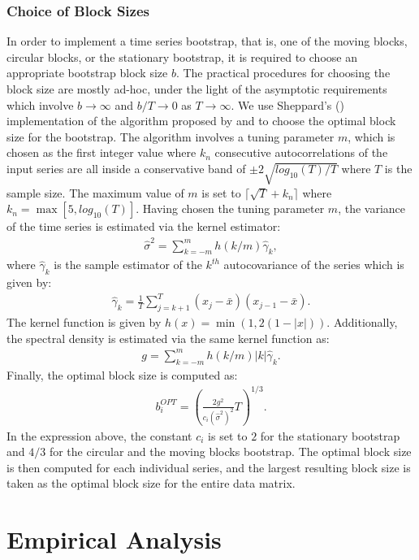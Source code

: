 \documentclass{article} %
\begin{document}
	\subsubsection{Choice of Block Sizes}
	In order to implement a time series bootstrap, that is, one of the moving blocks, circular blocks, or the stationary bootstrap, it is required to choose an appropriate bootstrap block size $b$. The practical procedures for choosing the block size are mostly ad-hoc, under the light of the asymptotic requirements which involve $b \to \infty$ and $b/T \to 0$ as $T \to \infty$. We use Sheppard's (\textcite{SHEPPARCH}) implementation of the algorithm proposed by \textcite{POLITISWHITE2004} and \textcite{PATTONPOLITIS2009} to choose the optimal block size for the bootstrap. The algorithm involves a tuning parameter $m$, which is chosen as the first integer value where $k_n$ consecutive autocorrelations of the input series are all inside a conservative band of $\pm 2 \sqrt{log_{10}(T)/T}$ where $T$ is the sample size. The maximum value of $m$ is set to $\lceil \sqrt{T} + k_n \rceil$ where $k_n = \max[5, log_{10}(T)]$. Having chosen the tuning parameter $m$, the variance of the time series is estimated via the kernel estimator:
	\begin{align}
		\hat{\sigma}^2 = \sum_{k=-m}^{m} h(k/m) \hat{\gamma}_k,
	\end{align}
	where $\hat{\gamma}_k$ is the sample estimator of the $k^{th}$ autocovariance of the series which is given by:
	\begin{align}
		\hat{\gamma}_k = \frac{1}{T} \sum_{j=k+1}^T (x_j - \bar{x}) (x_{j-1} - \bar{x}).
	\end{align}
	The kernel function is given by $h(x) = \min(1, 2 (1 - |x|))$. Additionally, the spectral density is estimated via the same kernel function as:
	\begin{align}
		g = \sum_{k=-m}^m h(k/m) |k| \hat{\gamma}_k.
	\end{align}
	Finally, the optimal block size is computed as:
	\begin{align}
		b_i^{OPT} = \left( \frac{ 2 g^2 }{ c_i (\hat{\sigma}^2)^2 } T \right)^{1/3}.
	\end{align}
	In the expression above, the constant $c_i$ is set to $2$ for the stationary bootstrap and $4/3$ for the circular and the moving blocks bootstrap. The optimal block size is then computed for each individual series, and the largest resulting block size is taken as the optimal block size for the entire data matrix.
	\section{Empirical Analysis}\label{sec:empirical}
\end{document}
